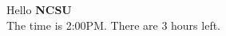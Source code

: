 \documentclass[11pt]{article}
\begin{document}
Hello \textbf{NCSU}
\\The time is 2:00PM.  There are 3 hours left.
\end{document}
